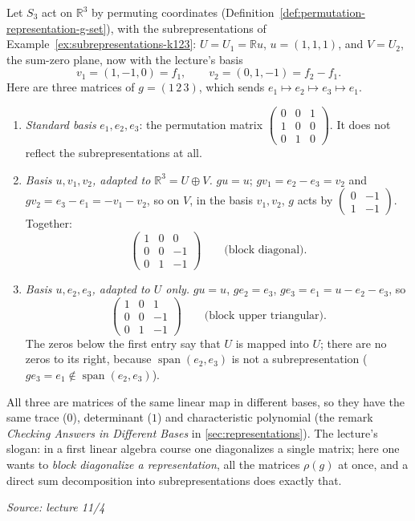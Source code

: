 \documentclass[11pt]{report}
\newcommand{\srcline}[1]{\par\hfill{\footnotesize\textit{Source: #1}}}
\begin{document}
\begin{exbox}\label{ex:s3-r3-three-bases}
Let $S_3$ act on $\mathbb{R}^3$ by permuting coordinates (Definition~\ref{def:permutation-representation-g-set}), with the subrepresentations of Example~\ref{ex:subrepresentations-k123}: $U = U_1 = \mathbb{R}u$, $u = (1,1,1)$, and $V = U_2$, the sum-zero plane, now with the lecture's basis
\[ v_1 = (1,-1,0) = f_1, \qquad v_2 = (0,1,-1) = f_2 - f_1. \]
Here are three matrices of $g = (1\,2\,3)$, which sends $e_1 \mapsto e_2 \mapsto e_3 \mapsto e_1$.
\begin{enumerate}
    \item \emph{Standard basis} $e_1, e_2, e_3$: the permutation matrix $\left(\begin{smallmatrix} 0 & 0 & 1 \\ 1 & 0 & 0 \\ 0 & 1 & 0 \end{smallmatrix}\right)$. It does not reflect the subrepresentations at all.
    \item \emph{Basis $u, v_1, v_2$, adapted to $\mathbb{R}^3 = U \oplus V$.} $gu = u$; $gv_1 = e_2 - e_3 = v_2$ and $gv_2 = e_3 - e_1 = -v_1 - v_2$, so on $V$, in the basis $v_1, v_2$, $g$ acts by $\left(\begin{smallmatrix} 0 & -1 \\ 1 & -1 \end{smallmatrix}\right)$. Together:
    \[ \left(\begin{array}{c|cc} 1 & 0 & 0 \\ \hline 0 & 0 & -1 \\ 0 & 1 & -1 \end{array}\right) \qquad \text{(block diagonal)}. \]
    \item \emph{Basis $u, e_2, e_3$, adapted to $U$ only.} $gu = u$, $ge_2 = e_3$, $ge_3 = e_1 = u - e_2 - e_3$, so
    \[ \left(\begin{array}{c|cc} 1 & 0 & 1 \\ \hline 0 & 0 & -1 \\ 0 & 1 & -1 \end{array}\right) \qquad \text{(block upper triangular)}. \]
    The zeros below the first entry say that $U$ is mapped into $U$; there are no zeros to its right, because $\operatorname{span}(e_2, e_3)$ is not a subrepresentation ($ge_3 = e_1 \notin \operatorname{span}(e_2, e_3)$).
\end{enumerate}
All three are matrices of the same linear map in different bases, so they have the same trace ($0$), determinant ($1$) and characteristic polynomial (the remark \emph{Checking Answers in Different Bases} in \ref{sec:representations}). The lecture's slogan: in a first linear algebra course one diagonalizes a single matrix; here one wants to \emph{block diagonalize a representation}, all the matrices $\rho(g)$ at once, and a direct sum decomposition into subrepresentations does exactly that.
\srcline{lecture 11/4}
\end{exbox}
\end{document}
